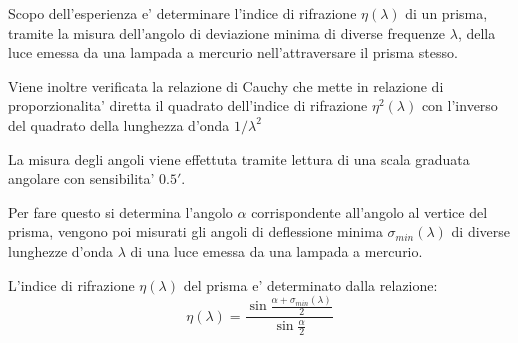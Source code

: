 Scopo dell'esperienza e' determinare l'indice di rifrazione $\eta (\lambda)$ di un prisma, tramite la misura dell'angolo di deviazione minima di diverse frequenze $\lambda$, della luce emessa da una lampada a mercurio nell'attraversare il prisma stesso.

Viene inoltre verificata la relazione di Cauchy che mette in relazione di proporzionalita' diretta il quadrato dell'indice di rifrazione $\eta^2 (\lambda)$ con l'inverso del quadrato della lunghezza d'onda $1/ \lambda^2$

La misura degli angoli viene effettuta tramite lettura di una scala graduata angolare con sensibilita' $0.5'$.

Per fare questo si determina l'angolo $\alpha$ corrispondente all'angolo al vertice del prisma, vengono poi misurati gli angoli di deflessione minima $\sigma_{min} (\lambda)$ di diverse lunghezze d'onda $\lambda$ di una luce emessa da una lampada a mercurio.

L'indice di rifrazione $\eta (\lambda)$ del prisma e' determinato dalla relazione:
\[
	\eta (\lambda) = \frac{\sin{\frac{\alpha + \sigma_{min} (\lambda)}{2}}}{\sin{\frac{\alpha}{2}}}
\]
